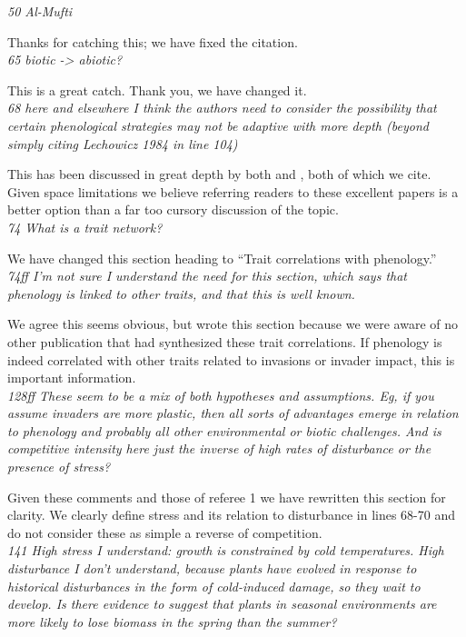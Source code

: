 \documentclass[11pt,a4paper]{letter}
\begin{document}
\begin{letter}{}
\emph{50 Al-Mufti}

Thanks for catching this; we have fixed the citation.\\

\emph{65 biotic -> abiotic?}

This is a great catch. Thank you, we have changed it.\\

\emph{68 here and elsewhere I think the authors need to consider the possibility that certain phenological strategies may not be adaptive with more depth (beyond simply citing Lechowicz 1984 in line 104)}

This has been discussed in great depth by both \citet{Lechowicz:1984cr} and \citet{Ollerton:1992kf}, both of which we cite. Given space limitations we believe referring readers to these excellent papers is a better option than a far too cursory discussion of the topic.\\

\emph{74 What is a trait network?}

We have changed this section heading to ``Trait correlations with phenology.''\\

\emph{74ff I'm not sure I understand the need for this section, which says that phenology is linked to other traits, and that this is well known.}

We agree this seems obvious, but wrote this section because we were aware of no other publication that had synthesized these trait correlations.  If phenology is indeed correlated with other traits related to invasions or invader impact, this is important information.\\

\emph{128ff These seem to be a mix of both hypotheses and assumptions. Eg, if you assume invaders are more plastic, then all sorts of advantages emerge in relation to phenology and probably all other environmental or biotic challenges. And is competitive intensity here just the inverse of high rates of disturbance or the presence of stress?}

Given these comments and those of referee 1 we have rewritten this section for clarity. We clearly define stress and its relation to disturbance in lines 68-70 and do not consider these as simple a reverse of competition.\\

\emph{141 High stress I understand: growth is constrained by cold temperatures. High disturbance I don't understand, because plants have evolved in response to historical disturbances in the form of cold-induced damage, so they wait to develop. Is there evidence to suggest that plants in seasonal environments are more likely to lose biomass in the spring than the summer?}


\end{letter}
\end{document}
